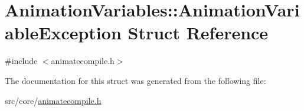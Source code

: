 \hypertarget{a00013}{\section{Animation\-Variables\-:\-:Animation\-Variable\-Exception Struct Reference}
\label{a00013}
}


{\ttfamily \#include $<$animatecompile.\-h$>$}



The documentation for this struct was generated from the following file\-:\begin{DoxyCompactItemize}
\item 
src/core/\hyperlink{a00200}{animatecompile.\-h}\end{DoxyCompactItemize}
